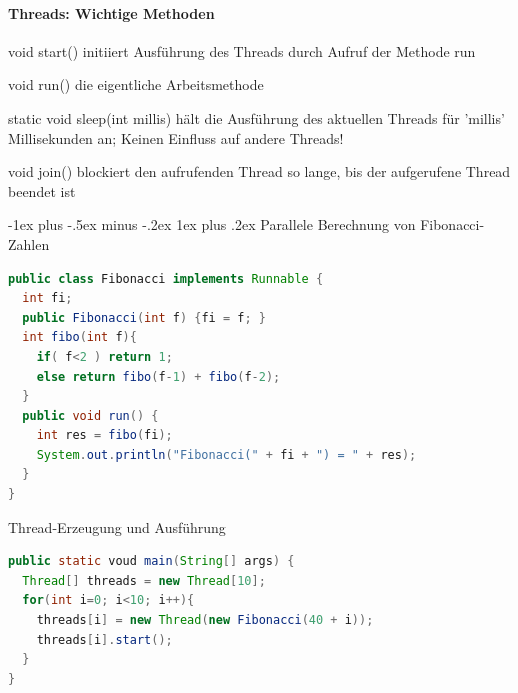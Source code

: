 \documentclass[10pt]{article}
\makeatletter
\renewcommand{\subsubsection}{\@startsection{subsubsection}{3}{0mm}%
                                {-1ex plus -.5ex minus -.2ex}%
                                {1ex plus .2ex}%
                                {\normalfont\small\bfseries}}
\makeatother
\begin{document}
  
  \paragraph{Threads: Wichtige Methoden}
  
  \begin{description*}
    \item[void start()] initiiert Ausführung des Threads durch Aufruf der Methode run
    \item[void run()] die eigentliche Arbeitsmethode
    \item[static void sleep(int millis)] hält die Ausführung des aktuellen Threads für 'millis' Millisekunden an; Keinen Einfluss auf andere Threads!
    \item[void join()] blockiert den aufrufenden Thread so lange, bis der aufgerufene Thread beendet ist
  \end{description*}
  
  \subsubsection{Parallele Berechnung von Fibonacci-Zahlen}
  \begin{lstlisting}[language=java]
public class Fibonacci implements Runnable {
  int fi;
  public Fibonacci(int f) {fi = f; }
  int fibo(int f){
    if( f<2 ) return 1;
    else return fibo(f-1) + fibo(f-2);
  }
  public void run() {
    int res = fibo(fi);
    System.out.println("Fibonacci(" + fi + ") = " + res);
  }
}
\end{lstlisting}
  
  Thread-Erzeugung und Ausführung
  \begin{lstlisting}[language=java]
public static voud main(String[] args) {
  Thread[] threads = new Thread[10];
  for(int i=0; i<10; i++){
    threads[i] = new Thread(new Fibonacci(40 + i));
    threads[i].start();
  }
}
\end{lstlisting}
  
\end{document}
